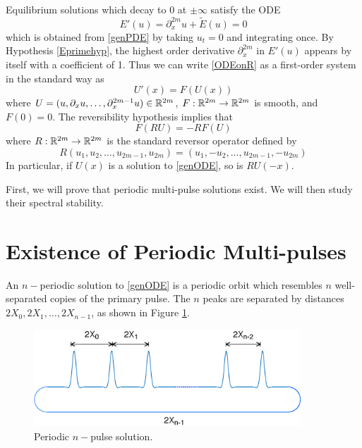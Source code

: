 \documentclass[thesis.tex]{subfiles}
\begin{document}
Equilibrium solutions which decay to 0 at $\pm \infty$ satisfy the ODE 
\begin{equation}\label{ODEonR}
E'(u) = \partial_x^{2m}u + \tilde{E}(u) = 0
\end{equation}
which is obtained from \eqref{genPDE} by taking $u_t = 0$ and integrating once. By Hypothesis \ref{Eprimehyp}, the highest order derivative $\partial_x^{2m}$ in $E'(u)$ appears by itself with a coefficient of 1. Thus we can write \eqref{ODEonR} as a first-order system in the standard way as
\begin{equation}\label{genODE}
U'(x) = F(U(x))
\end{equation}
where $U = (u, \partial_x u, \dots, \partial_x^{2m-1} u) \in {\mathbb R}^{2m}$, $F: {\mathbb R}^{2m} \rightarrow {\mathbb R}^{2m}$ is smooth, and $F(0) = 0$. The reversibility hypothesis implies that
\begin{equation}\label{genODErev}
F(RU) = -RF(U)
\end{equation}
where $R:{\mathbb R}^{2m} \rightarrow {\mathbb R}^{2m}$ is the standard reversor operator defined by
\begin{equation}\label{reverserR2m}
R(u_1, u_2, \dots, u_{2m-1}, u_{2m}) = (u_1, -u_2, \dots, u_{2m-1}, -u_{2m})
\end{equation}
In particular, if $U(x)$ is a solution to \eqref{genODE}, so is $RU(-x)$.

First, we will prove that periodic multi-pulse solutions exist. We will then study their spectral stability.

\section{Existence of Periodic Multi-pulses}

An $n-$periodic solution to \eqref{genODE} is a periodic orbit which resembles $n$ well-separated copies of the primary pulse. The $n$ peaks are separated by distances $2X_0, 2X_1, \dots, 2X_{n-1}$, as shown in Figure \ref{fig:permultipulse}.

\begin{figure}[H]
\label{fig:permultipulse}
\includegraphics[width=10cm]{periodic/multipulseperiodic}
\caption{Periodic $n-$pulse solution.}
\end{figure} 
\end{document}
